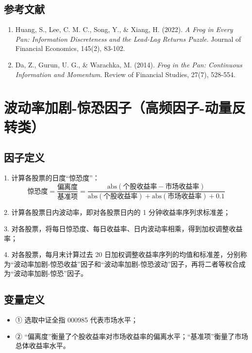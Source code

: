\documentclass{article}
\begin{document}
\subsection{参考文献}
\begin{enumerate}
    \item Huang, S., Lee, C. M. C., Song, Y., \& Xiang, H. (2022). \textit{A Frog in Every Pan: Information Discreteness and the Lead-Lag Returns Puzzle}. Journal of Financial Economics, 145(2), 83-102.
    \item Da, Z., Gurun, U. G., \& Warachka, M. (2014). \textit{Frog in the Pan: Continuous Information and Momentum}. Review of Financial Studies, 27(7), 528-554.
\end{enumerate}

\section{波动率加剧-惊恐因子（高频因子-动量反转类）}

\subsection{因子定义}

1. 计算各股票的日度“惊恐度”：
\begin{equation}
    \text{惊恐度} = \frac{\text{偏离度}}{\text{基准项}} = \frac{\mathrm{abs}(\text{个股收益率} - \text{市场收益率})}{\mathrm{abs}(\text{个股收益率}) + \mathrm{abs}(\text{市场收益率}) + 0.1}
\end{equation}

2. 计算各股票日内波动率，即对各股票日内的 1 分钟收益率序列求标准差；

3. 对各股票，将每日惊恐度、每日收益率、日内波动率相乘，得到加权调整收益率；

4. 对各股票，每月末计算过去 20 日加权调整收益率序列的均值和标准差，分别称为“波动率加剧-惊恐收益”因子和“波动率加剧-惊恐波动”因子，再将二者等权合成为“波动率加剧-惊恐”因子。

\subsection{变量定义}
\begin{itemize}
    \item ① 选取中证全指 000985 代表市场水平；
    \item ② “偏离度”衡量了个股收益率对市场收益率的偏离水平；“基准项”衡量了市场总体收益率水平。
\end{itemize}
\end{document}
